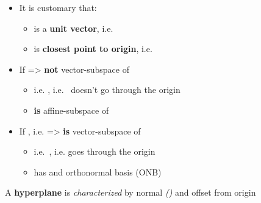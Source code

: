\begin{itemize}

      \item
            It is customary that:

            \begin{itemize}

                  \item
                         is a \textbf{unit vector},
                        i.e. 
                  \item
                         is \textbf{closest point to origin},
                        i.e. 
            \end{itemize}
      \item
            If  =>
             \textbf{not} vector-subspace of 

            \begin{itemize}

                  \item
                        i.e. , i.e.~ doesn't go through the origin
                  \item
                         \textbf{is} affine-subspace of 
            \end{itemize}
      \item
            If ,
            i.e.  =>
             \textbf{is} vector-subspace of 

            \begin{itemize}

                  \item
                        i.e.~, i.e.  goes through the
                        origin
                  \item
                         has  and orthonormal basis (ONB)
            \end{itemize}
\end{itemize}

\hSep %

A \textbf{hyperplane}  is \emph{characterized} by normal 
\emph{()} and offset from origin 

